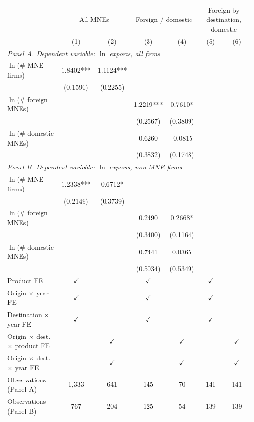 \begin{tabular}{lcccccc} \hline
 & \multicolumn{2}{c}{All MNEs} & \multicolumn{2}{c}{Foreign / domestic} & \multicolumn{2}{c}{Foreign by destination, domestic} \\
 & (1) & (2) & (3) & (4) & (5) & (6) \\ \hline
\multicolumn{7}{l}{\textit{Panel A. Dependent variable: $\ln$ exports, all firms}} \\
$\ln$(\# MNE firms) & 1.8402*** & 1.1124*** &  &  &  &  \\
 & (0.1590) & (0.2255) &  &  &  &  \\
$\ln$(\# foreign MNEs) &  &  & 1.2219*** & 0.7610* &  &  \\
 &  &  & (0.2567) & (0.3809) &  &  \\
$\ln$(\# domestic MNEs) &  &  & 0.6260 & -0.0815 &  &  \\
 &  &  & (0.3832) & (0.1748) &  &  \\
\midrule
\multicolumn{7}{l}{\textit{Panel B. Dependent variable: $\ln$ exports, non-MNE firms}} \\
$\ln$(\# MNE firms) & 1.2338*** & 0.6712* &  &  &  &  \\
 & (0.2149) & (0.3739) &  &  &  &  \\
$\ln$(\# foreign MNEs) &  &  & 0.2490 & 0.2668* &  &  \\
 &  &  & (0.3400) & (0.1164) &  &  \\
$\ln$(\# domestic MNEs) &  &  & 0.7441 & 0.0365 &  &  \\
 &  &  & (0.5034) & (0.5349) &  &  \\
\hline
Product FE & $\checkmark$ &  & $\checkmark$ &  & $\checkmark$ &  \\
Origin $\times$ year FE & $\checkmark$ &  & $\checkmark$ &  & $\checkmark$ &  \\
Destination $\times$ year FE & $\checkmark$ &  & $\checkmark$ &  & $\checkmark$ &  \\
Origin $\times$ dest.\ $\times$ product FE &  & $\checkmark$ &  & $\checkmark$ &  & $\checkmark$ \\
Origin $\times$ dest.\ $\times$ year FE &  & $\checkmark$ &  & $\checkmark$ &  & $\checkmark$ \\
Observations (Panel A) & 1,333 & 641 & 145 & 70 & 141 & 141 \\
Observations (Panel B) & 767 & 204 & 125 & 54 & 139 & 139 \\
\hline
\end{tabular}

